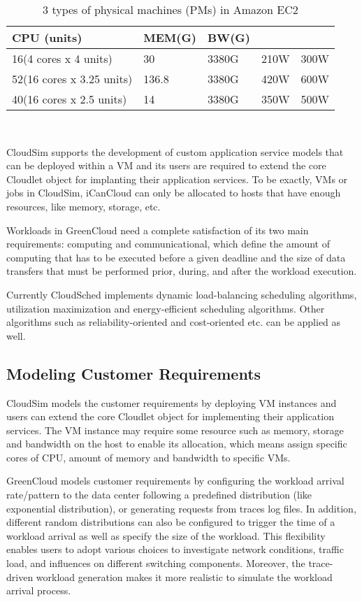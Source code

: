 \documentclass[3p, twocolumn]{elsarticle}
\begin{document}
\begin{table}
\scriptsize
\caption{3 types of physical machines (PMs) in Amazon EC2
}
\begin{center}
\begin{tabular}{|l|l|l|l|l|}
\hline CPU (units) & MEM(G)& BW(G)&&
\\\hline
\hline 16(4 cores x 4 units) & 30& 3380G &210W&300W \\
\hline 52(16 cores x 3.25 units) & 136.8&3380G&420W&600W \\
\hline 40(16 cores x 2.5 units) &14&3380G&350W&500W \\
\hline
\end{tabular} \\
\end{center}
\end{table}
CloudSim supports the development of custom application service models that can be deployed within a VM and its users are required to extend the core Cloudlet object for implanting their application services. To be exactly, VMs or jobs in CloudSim, iCanCloud can only be allocated to hosts that have enough resources, like memory, storage, etc.

Workloads in GreenCloud need a complete satisfaction of its two main requirements: computing and communicational, which define the amount of computing that has to be executed before a given deadline and the size of data transfers that must be performed prior, during, and after the workload execution.

Currently CloudSched implements dynamic load-balancing scheduling algorithms, utilization maximization and energy-efficient scheduling algorithms. Other algorithms such as reliability-oriented and cost-oriented etc. can be applied as well.

\subsection{Modeling Customer Requirements}
CloudSim models the customer requirements by deploying VM instances and users can extend the core Cloudlet object for implementing their application services. The VM instance may require some resource such as memory, storage and bandwidth on the host to enable its allocation, which means assign specific cores of CPU, amount of memory and bandwidth to specific VMs.

GreenCloud models customer requirements by configuring the workload arrival rate/pattern to the data center following a predefined distribution (like exponential distribution), or generating requests from traces log files. In addition, different random distributions can also be configured to trigger the time of a workload arrival as well as specify the size of the workload. This flexibility enables users to adopt various choices to investigate network conditions, traffic load, and influences on different switching components. Moreover, the trace-driven workload generation makes it more realistic to simulate the workload arrival process.
\end{document}
